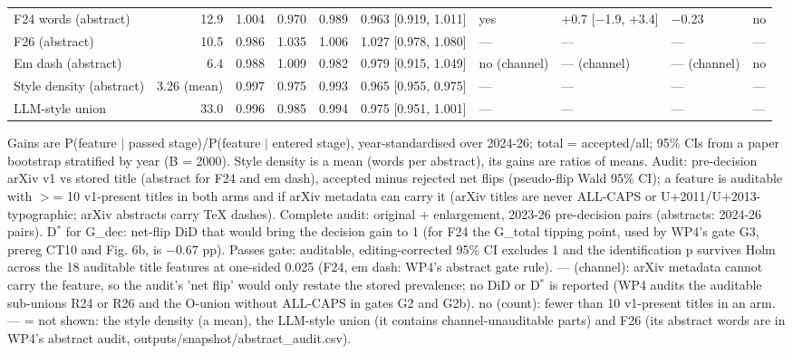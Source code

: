 \begin{table}[t]
\begin{tabular}{l r r r r l l l l l}
F24 words (abstract) & 12.9 & 1.004 & 0.970 & 0.989 & 0.963 [0.919, 1.011] & yes & +0.7 [$-$1.9, +3.4] & $-$0.23 & no \\
F26 (abstract) & 10.5 & 0.986 & 1.035 & 1.006 & 1.027 [0.978, 1.080] & --- & --- & --- & --- \\
Em dash (abstract) & 6.4 & 0.988 & 1.009 & 0.982 & 0.979 [0.915, 1.049] & no (channel) & --- (channel) & --- (channel) & no \\
Style density (abstract) & 3.26 (mean) & 0.997 & 0.975 & 0.993 & 0.965 [0.955, 0.975] & --- & --- & --- & --- \\
LLM-style union & 33.0 & 0.996 & 0.985 & 0.994 & 0.975 [0.951, 1.001] & --- & --- & --- & --- \\
\bottomrule
\end{tabular}
\par\smallskip
\parbox{\linewidth}{\scriptsize Gains are P(feature $|$ passed stage)/P(feature $|$ entered stage), year-standardised over 2024-26; total = accepted/all; 95\% CIs from a paper bootstrap stratified by year (B = 2000). Style density is a mean (words per abstract), its gains are ratios of means. Audit: pre-decision arXiv v1 vs stored title (abstract for F24 and em dash), accepted minus rejected net flips (pseudo-flip Wald 95\% CI); a feature is auditable with $>$= 10 v1-present titles in both arms and if arXiv metadata can carry it (arXiv titles are never ALL-CAPS or U+2011/U+2013-typographic; arXiv abstracts carry TeX dashes). Complete audit: original + enlargement, 2023-26 pre-decision pairs (abstracts: 2024-26 pairs). D$^{*}$ for G\_dec: net-flip DiD that would bring the decision gain to 1 (for F24 the G\_total tipping point, used by WP4's gate G3, prereg CT10 and Fig. 6b, is $-$0.67 pp). Passes gate: auditable, editing-corrected 95\% CI excludes 1 and the identification p survives Holm across the 18 auditable title features at one-sided 0.025 (F24, em dash: WP4's abstract gate rule). --- (channel): arXiv metadata cannot carry the feature, so the audit's 'net flip' would only restate the stored prevalence; no DiD or D$^{*}$ is reported (WP4 audits the auditable sub-unions R24 or R26 and the O-union without ALL-CAPS in gates G2 and G2b). no (count): fewer than 10 v1-present titles in an arm. --- = not shown: the style density (a mean), the LLM-style union (it contains channel-unauditable parts) and F26 (its abstract words are in WP4's abstract audit, outputs/snapshot/abstract\_audit.csv).}
\end{table}
